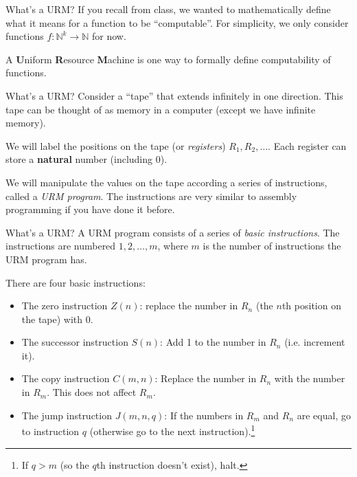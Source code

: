 \documentclass{beamer}
\begin{document}
\begin{frame}{What's a URM?}
If you recall from class, we wanted to mathematically define what it means for a function to be ``computable''. For simplicity, we only consider functions $f: \mathbb N^k \to \mathbb N$ for now.

\vspace{4mm}

A \textbf{U}niform \textbf{R}esource \textbf{M}achine is one way to formally define computability of functions.


\end{frame}

\begin{frame}{What's a URM?}
Consider a ``tape'' that extends infinitely in one direction. This tape can be thought of as memory in a computer (except we have infinite memory).

\vspace{2mm}

We will label the positions on the tape (or \textit{registers}) $R_1, R_2, \ldots$. Each register can store a \textbf{natural} number (including 0).
\begin{center}
\end{center}

We will manipulate the values on the tape according a series of instructions, called a \textit{URM program}. The instructions are very similar to assembly programming if you have done it before.
\end{frame}

\begin{frame}{What's a URM?}
A URM program consists of a series of \textit{basic instructions}. The instructions are numbered $1, 2, \ldots, m$, where $m$ is the number of instructions the URM program has.

\vspace{2mm}

There are four basic instructions:
\begin{itemize}
\item The zero instruction $Z(n)$: replace the number in $R_n$ (the $n$th position on the tape) with 0.
\item The successor instruction $S(n)$: Add 1 to the number in $R_n$ (i.e. increment it).
\item The copy instruction $C(m, n)$: Replace the number in $R_n$ with the number in $R_m$. This does not affect $R_m$.
\item The jump instruction $J(m, n, q)$: If the numbers in $R_m$ and $R_n$ are equal, go to instruction $q$ (otherwise go to the next instruction).\footnote{If $q > m$ (so the $q$th instruction doesn't exist), halt.}
\end{itemize}
\end{frame}
\end{document}
